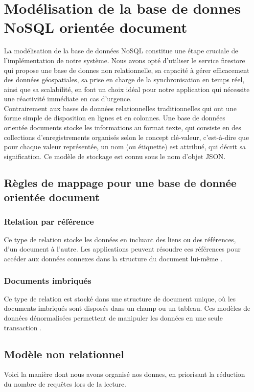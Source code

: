 \section{Modélisation de la base de donnes NoSQL orientée document}
La modélisation de la base de données NoSQL constitue une étape cruciale de l'implémentation de notre système. Nous avons opté d’utiliser le service firestore qui propose une base de donnes non relationnelle, sa capacité à gérer efficacement des données géospatiales, sa prise en charge de la synchronisation en temps réel, ainsi que sa scalabilité, en font un choix idéal pour notre application qui nécessite une réactivité immédiate en cas d'urgence.\\

Contrairement aux bases de données relationnelles traditionnelles qui ont une forme simple de disposition en lignes et en colonnes. Une base de données orientée documents stocke les informations au format texte, qui consiste en des collections d'enregistrements organisés selon le concept clé-valeur, c'est-à-dire que pour chaque valeur représentée, un nom (ou étiquette) est attribué, qui décrit sa signification. Ce  modèle de stockage est connu sous le nom d'objet JSON.

\subsection{Règles de mappage pour une base de donnée orientée document}
\subsubsection{Relation par référence}
Ce type de relation stocke les données en incluant des liens ou des références, d'un document à l'autre. Les applications peuvent résoudre ces références pour accéder aux données connexes dans la structure du document lui-même \cite{harley_vera_data}.
\subsubsection{Documents imbriqués}
Ce type de relation est stocké dans une structure de document unique, où les documents imbriqués sont disposés dans un champ ou un tableau. Ces modèles de données dénormalisées permettent de manipuler les données en une seule transaction \cite{harley_vera_data}.

\subsection{Modèle non relationnel}
Voici la manière dont nous avons organisé nos donnes, en priorisant la réduction du nombre de requêtes lors de la lecture.

